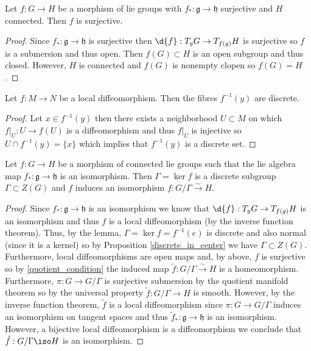 \documentclass[12pt]{extarticle}
\begin{document}
\newcommand{\g}{\mathfrak{g}}
\newcommand{\h}{\mathfrak{h}}

\begin{proposition}
Let $f : G \to H$ be a morphism of lie groups with $f_* : \g \to \h$ surjective and $H$ connected. Then $f$ is surjective.
\end{proposition}

\begin{proof}
Since $f_* : \g \to \h$ is surjective then $\d{f} : T_g G \to T_{f(g)} H$ is surjective so $f$ is a submersion and thus open. Then $f(G) \subset H$ is an open subgroup and thus closed. However, $H$ is connected and $f(G)$ is nonempty clopen so $f(G) = H$. 
\end{proof}

\begin{lemma}
Let $f : M \to N$ be a local diffeomorphism. Then the fibres $f^{-1}(y)$ are discrete.
\end{lemma}

\begin{proof}
Let $x \in f^{-1}(y)$ then there exists a neighborhood $U \subset M$ on which $f|_U : U \to f(U)$ is a diffeomorphism and thus $f|_U$ is injective so $U \cap f^{-1}(y) = \{ x \}$ which implies that $f^{-1}(y)$ is a discrete set.
\end{proof}

\begin{proposition}
Let $f : G \to H$ be a morphism of connected lie groups such that the lie algebra map $f_* : \g \to \h$ is an isomorphism. Then $\Gamma = \ker{f}$ is a discrete subgroup $\Gamma \subset Z(G)$ and $f$ induces an isomorphism $f : G / \Gamma \xrightarrow{\sim} H$. 
\end{proposition}

\begin{proof}
Since $f_* : \g \to \h$ is an isomorphism we know that $\d{f} : T_g G \to T_{f(g)} H$ is an isomorphism and thus $f$ is a local diffeomorphism (by the inverse function theorem). Thus, by the lemma, $\Gamma = \ker{f} = f^{-1}(e)$ is discrete and also normal (since it is a kernel) so by Proposition \ref{discrete_in_center} we have $\Gamma \subset Z(G)$. Furthermore, local diffeomorphisms are open maps and, by above, $f$ is surjective so by \ref{quotient_condition} the induced map $\tilde{f} : G / \Gamma \xrightarrow{\sim} H$ is a homeomorphism. Furthermore, $\pi : G \to G / \Gamma$ is surjective submersion by the quotient manifold theorem so by the universal property $\tilde{f} : G / \Gamma \to H$ is smooth. However, by the inverse function theorem, $\tilde{f}$ is a local diffeomorphism since $\pi : G \to G / \Gamma$ induces an isomorphism on tangent spaces and thus $\tilde{f}_* : \g \to \h$ is an isomorphism. However, a bijective local diffeomorphism is a diffeomorphism we conclude that $\tilde{f} : G / \Gamma \iso H$ is an isomorphism.
\end{proof}
\end{document}
